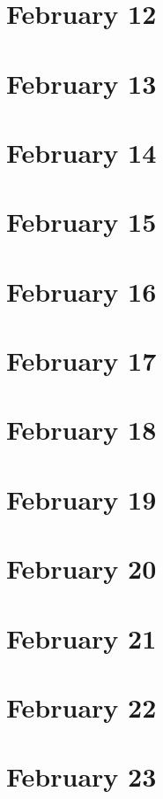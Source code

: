 \section{February 12}

\section{February 13}

\section{February 14}

\section{February 15}

\section{February 16}

\section{February 17}

\section{February 18}

\section{February 19}

\section{February 20}

\section{February 21}

\section{February 22}

\section{February 23}

